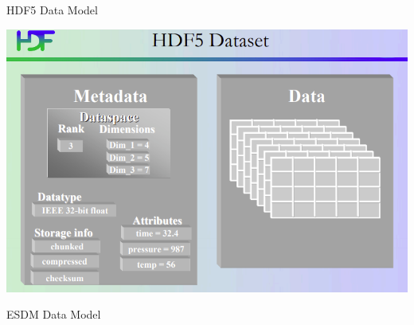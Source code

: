 \documentclass[compress,11pt,xcolor=svgnames,aspectratio=169]{beamer}
\begin{document}
\begin{frame}[t]{HDF5 Data Model}

\begin{center}
\includegraphics[scale=0.5]{fig/hdf5-data}
\end{center}

\end{frame}

\begin{frame}[t]{ESDM Data Model}

\begin{center}
\end{center}

\end{frame}
\end{document}
